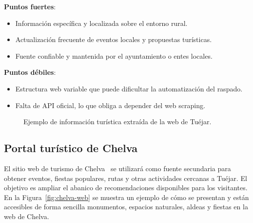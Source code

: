 \textbf{Puntos fuertes}:
\begin{itemize}
    \item Información específica y localizada sobre el entorno rural.
    \item Actualización frecuente de eventos locales y propuestas turísticas.
    \item Fuente confiable y mantenida por el ayuntamiento o entes locales.
\end{itemize}

\textbf{Puntos débiles}:
\begin{itemize}
    \item Estructura web variable que puede dificultar la automatización del raspado.
    \item Falta de API oficial, lo que obliga a depender del web scraping.
\end{itemize}

\begin{figure}[h!tb]
    \centering
    \setlength{\fboxsep}{15pt}%
    \setlength{\fboxrule}{0.5pt}%
    \caption{Ejemplo de información turística extraída de la web de Tuéjar.}
    \label{fig:tuejar-web}
\end{figure}

\subsection{Portal turístico de Chelva}
El sitio web de turismo de Chelva~\cite{url.chelva} se utilizará como fuente secundaria para obtener eventos, fiestas populares, rutas y otras actividades cercanas a Tuéjar. El objetivo es ampliar el abanico de recomendaciones disponibles para los visitantes. 
En la Figura~\ref{fig:chelva-web} se muestra un ejemplo de cómo se presentan y están accesibles de forma sencilla monumentos, espacios naturales, aldeas y fiestas en la web de Chelva.

